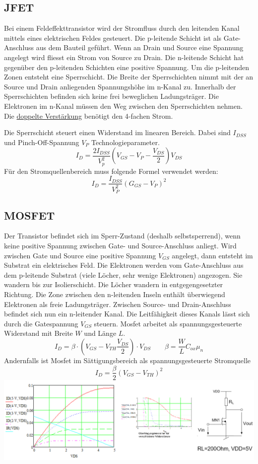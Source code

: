 \subsection{JFET}
Bei einem Feldeffekttransistor wird der Stromfluss durch den leitenden Kanal mittels eines elektrischen Feldes gesteuert. Die p-leitende Schicht ist als Gate-Anschluss aus dem Bauteil geführt. Wenn an Drain und Source eine Spannung angelegt wird fliesst ein Strom von Source zu Drain. Die n-leitende Schicht hat gegenüber den p-leitenden Schichten eine positive Spannung. Um die p-leitenden Zonen entsteht eine Sperrschicht. Die Breite der Sperrschichten nimmt mit der an Source und Drain anliegenden Spannungshöhe im n-Kanal zu. Innerhalb der Sperrschichten befinden sich keine frei beweglichen Ladungsträger. Die Elektronen im n-Kanal müssen den Weg zwischen den Sperrschichten nehmen. Die \underline{doppelte Verstärkung} benötigt den 4-fachen Strom.

Die Sperrschicht steuert einen Widerstand im linearen Bereich. Dabei sind $I_{DSS}$ und Pinch-Off-Spannung $V_P$ Technologieparameter.
\[
I_D = \frac{2I_{DSS}}{V_p^2}\left(V_{GS} - V_P - \frac{V_{DS}}{2}\right)V_{DS}
\]
Für den Stromquellenbereich muss folgende Formel verwendet werden:
\[
I_D = \frac{I_{DSS}}{V_P^2}\left(G_{GS} - V_P\right)^2
\]

\subsection{MOSFET}
Der Transistor befindet sich im Sperr-Zustand (deshalb selbstsperrend), wenn keine positive Spannung zwischen Gate- und Source-Anschluss anliegt. Wird zwischen Gate und Source eine positive Spannung $V_{GS}$ angelegt, dann entsteht im Substrat ein elektrisches Feld. Die Elektronen werden vom Gate-Anschluss aus dem p-leitende Substrat (viele Löcher, sehr wenige Elektronen) angezogen. Sie wandern bis zur Isolierschicht. Die Löcher wandern in entgegengesetzter Richtung. Die Zone zwischen den n-leitenden Inseln enthält überwiegend Elektronen als freie Ladungsträger. Zwischen Source- und Drain-Anschluss befindet sich nun ein n-leitender Kanal. Die Leitfähigkeit dieses Kanals lässt sich durch die Gatespannung $V_{GS}$ steuern.
Mosfet arbeitet als spannungsgesteuerte Widerstand mit Breite $W$ und Länge $L$.
\[
I_D = \beta \cdot \left(V_{GS} - V_{TH} \frac{V_{DS}}{2}\right)\cdot V_{DS} \qquad \beta = \frac{W}{L}C_{ox}\mu_n
\]
Andernfalls ist Mosfet im Sättigungsbereich als spannungsgesteuerte Stromquelle
\[
I_D = \frac{\beta}{2}\left(V_{GS} - V_{TH}\right)^2
\]
\includegraphics[width=\columnwidth]{Images/kennlinie_mosefet}

